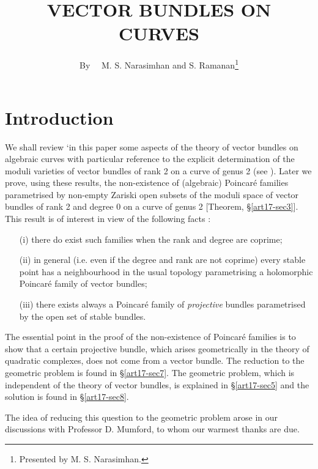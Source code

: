 \title{VECTOR BUNDLES ON CURVES}

\author{By~~ M. S. Narasimhan and S. Ramanan\footnote{Presented by M. S. Narasimhan.}}
\date{}

\maketitle


\setcounter{pageoriginal}{334}
\section{Introduction}\label{art17-sec1}
\pageoriginale

We shall review `in this paper some aspects of the theory of vector bundles on algebraic curves with particular reference to the explicit determination of the moduli varieties of vector bundles of rank 2 on a curve of genus 2 (see \cite{art17-key3}). Later we prove, using these results, the non-existence of (algebraic) Poincar\'e families parametrised by non-empty Zariski open subsets of the moduli space of vector bundles of rank 2 and degree 0 on a curve of genus 2 [Theorem, \S\ref{art17-sec3}]. This result is of interest in view of the following facts :
\begin{itemize}
\item[(i)] there do exist such families when the rank and degree are coprime;

\item[(ii)] in general (i.e. even if the degree and rank are not coprime) every stable point has a neighbourhood in the usual topology parametrising a holomorphic Poincar\'e family of vector bundles;

\item[(iii)] there exists always a Poincar\'e family of {\em projective} bundles para\-metrised by the open set of stable bundles.
\end{itemize}

The essential point in the proof of the non-existence of Poincar\'e families is to show that a certain projective bundle, which arises geometrically in the theory of quadratic complexes, does not come from a vector bundle. The reduction to the geometric problem is found in \S\ref{art17-sec7}. The geometric problem, which is independent of the theory of vector bundles, is explained in \S\ref{art17-sec5} and the solution is found in \S\ref{art17-sec8}.

The idea of reducing this question to the geometric problem arose in our discussions with Professor D. Mumford, to whom our warmest thanks are due.

